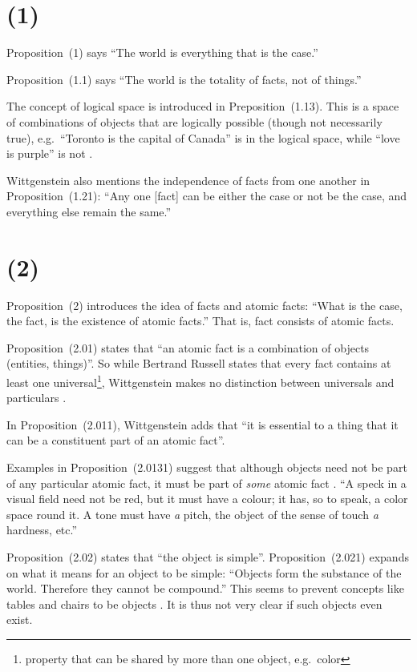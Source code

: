 \documentclass{article}
\newcommand{\prop}[1]{(#1)}
\begin{document}
\section*{\prop{1}}

Proposition~\prop{1} says ``The world is everything that is the case.''

Proposition~\prop{1.1} says ``The world is the totality of facts, not of things.''

The concept of logical space is introduced in Preposition~\prop{1.13}. This is a space of combinations of objects that are logically possible (though not necessarily true), e.g.\ ``Toronto is the capital of Canada'' is in the logical space, while ``love is purple'' is not \cite{Vi2019}.

Wittgenstein also mentions the independence of facts from one another in Proposition~\prop{1.21}: ``Any one [fact] can be either the case or not be the case, and everything else remain the same.''

\section*{\prop{2}}

Proposition~\prop{2} introduces the idea of facts and atomic facts: ``What is the case, the fact, is the existence of atomic facts.''
That is, fact consists of atomic facts.

Proposition~\prop{2.01} states that ``an atomic fact is a combination of objects (entities, things)''.
So while Bertrand Russell states that every fact contains at least one universal\footnote{property that can be shared by more than one object, e.g.\ color}, Wittgenstein makes no distinction between universals and particulars \cite{Sp2007}.

In Proposition~\prop{2.011}, Wittgenstein adds that ``it is essential to a thing that it can be a constituent part of an atomic fact''.

Examples in Proposition~\prop{2.0131} suggest that although objects need not be part of any particular atomic fact, it must be part of \emph{some} atomic fact \cite{Sp}.
``A speck in a visual field need not be red, but it must have a colour; it has, so to speak, a color space round it.
A tone must have \emph{a} pitch, the object of the sense of touch \emph{a} hardness, etc.''

Proposition~\prop{2.02} states that ``the object is simple''.
Proposition~\prop{2.021} expands on what it means for an object to be simple: ``Objects form the substance of the world. Therefore they cannot be compound.''
This seems to prevent concepts like tables and chairs to be objects \cite{Vi2019}.
It is thus not very clear if such objects even exist.
\end{document}
